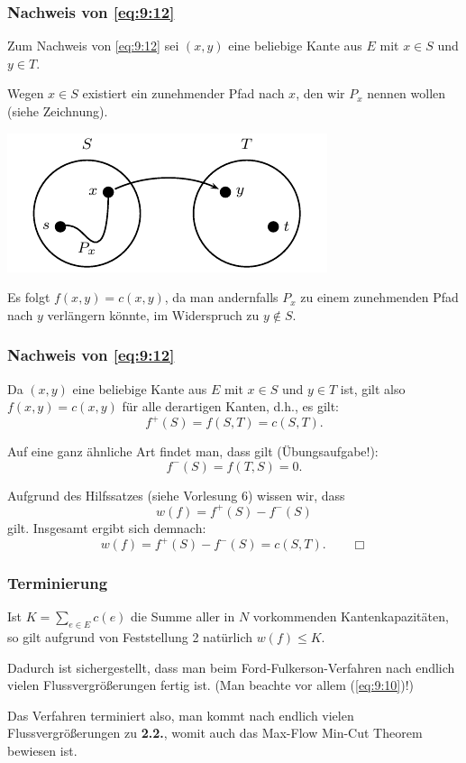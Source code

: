 \documentclass[smaller]{beamer}
\begin{document}
\begin{frame}
 \frametitle{Nachweis von \eqref{eq:9:12}}
 Zum Nachweis von \eqref{eq:9:12} sei $(x,y)$ eine beliebige Kante aus $E$ mit $x \in S$ und $y \in T$. \\ \vspace*{0.2cm}
 
 Wegen $x \in S$ existiert ein zunehmender Pfad nach $x$, den wir $P_x$ nennen wollen (siehe Zeichnung). 
 
 \begin{center}
  \includegraphics{fig19.pdf}
 \end{center}
Es folgt $f(x,y) = c(x,y)$, \alert{da man andernfalls $P_x$ zu einem zunehmenden Pfad nach $y$ verlängern könnte}, im Widerspruch zu $y \not\in S$.
\end{frame}

\begin{frame}
 \frametitle{Nachweis von \eqref{eq:9:12}}
 Da $(x,y)$ eine beliebige Kante aus $E$ mit $x \in S$ und $y \in T$ ist, gilt also $f(x,y) = c(x,y)$ für alle derartigen Kanten, d.h., es gilt:
\[
f^+(S) = f(S,T) = c(S,T).
\]

Auf eine ganz ähnliche Art findet man, dass gilt (Übungsaufgabe!):
\[
f^-(S) = f(T,S) = 0.
\]

Aufgrund des Hilfssatzes (siehe Vorlesung 6) wissen wir, dass
\[
w(f) = f^+(S) - f^-(S)
\]
gilt. Insgesamt ergibt sich demnach:
\[
w(f) = f^+(S) - f^-(S) = c(S,T). \qquad \Box
\]
\end{frame}

\begin{frame}
 \frametitle{Terminierung}
 Ist $K = \sum\limits_{e \in E}{c(e)}$ die Summe aller in $N$ vorkommenden Kantenkapazitäten, so gilt aufgrund von Feststellung 2 natürlich $w(f) \leq K$. \\ \vspace*{0.2cm}
 
 \alert{Dadurch ist sichergestellt, dass man beim Ford-Fulkerson-Verfahren nach endlich vielen Flussvergrößerungen fertig ist. (Man beachte vor allem (\ref{eq:9:10})!)} \\ \vspace*{0.2cm}

Das Verfahren terminiert also, man kommt nach endlich vielen Flussvergrößerungen zu \textbf{2.2.}, womit auch das \alert{Max-Flow Min-Cut Theorem} bewiesen ist.
\end{frame}
\end{document}

